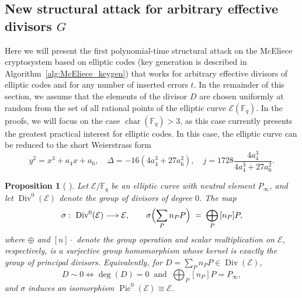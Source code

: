 \documentclass[sn-mathphys-num]{sn-jnl_modified}
\newcommand{\FF}{\ensuremath{\mathbb{F}}}
\newtheorem{proposition}[theorem]{Proposition}%
\begin{document}
\subsection{New structural attack for arbitrary effective divisors $G$}\label{sec:our_attack}


Here we will present the first polynomial-time structural attack on the McEliece cryptosystem based on elliptic codes (key generation is described in Algorithm~\ref{alg:McEliece_keygen}) that works for arbitrary {effective} divisors of elliptic codes and for any number of inserted errors $t$. In the remainder of this section, we assume that the elements of the divisor $D$ are chosen uniformly at random from the set of all rational points of the elliptic curve $\mathcal{E}(\mathbb{F}_q)$. {In the proofs, we will focus on the case $\operatorname{char}(\mathbb{F}_q) > 3$, as this case currently presents the greatest practical interest for elliptic codes. In this case, the elliptic curve can be reduced to the short Weierstrass form
\[
y^{2} = x^{3} + a_{4}x + a_{6}, \quad \Delta = -16\left(4a_{4}^{3} + 27a_{6}^{2}\right), \quad j = 1728 \frac{4a_{4}^{3}}{4a_{4}^{3} + 27a_{6}^{2}}.
\]}


\begin{proposition}[ {\cite[Prop.~III.3.4, Cor.~III.3.5]{Silverman09}}]
\label{th:abel-jacobi}
Let $\mathcal{E}/\FF_q$ be an elliptic curve with neutral element $P_\infty$, and let $\operatorname{Div}^0(\mathcal{E})$ denote the group of divisors of degree $0$. The map
\[
\sigma:\ \operatorname{Div}^0(\mathcal{E}) \longrightarrow \mathcal{E},
\qquad
\sigma\Bigl(\sum_P n_P P\Bigr) \;=\; \bigoplus_P\, [n_P]P ,
\]
where $\oplus$ and $[n]\cdot$ denote the group operation and scalar multiplication on $\mathcal{E}$, respectively, is a surjective group homomorphism whose kernel is exactly the group of principal divisors. Equivalently, for $D = \sum_P n_P P \in \operatorname{Div}(\mathcal{E})$,
\[
D \sim 0
\iff
\deg(D) = 0 \ \text{ and } \ \bigoplus_P [n_P]P = P_\infty ,
\]
and $\sigma$ induces an isomorphism $\operatorname{Pic}^0(\mathcal{E}) \cong \mathcal{E}$.
\end{proposition}
\end{document}
